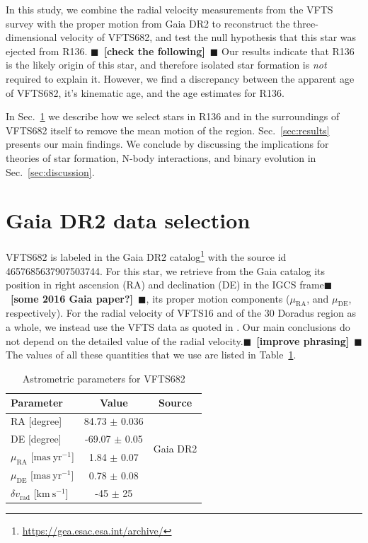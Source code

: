 \documentclass{aa}
\newcommand{\todo}[1]{{\large $\blacksquare$~\textbf{\color{red}[#1]}}~$\blacksquare$}
\newcommand{\kms}{{\mathrm{km\ s^{-1}}}}
\DeclareRobustCommand{\Tabref}[1]{Table~\ref{#1}}
\DeclareRobustCommand{\Secref}[1]{Sec.~\ref{#1}}
\begin{document}
In this study, we combine the radial velocity measurements from the
VFTS survey \citep[][]{evans:11} with the proper motion from Gaia DR2
to reconstruct the three-dimensional velocity of VFTS682, and test the
null hypothesis that this star was ejected from R136. \todo{check the
  following} Our results indicate that R136 is the likely origin of
this star, and therefore isolated star formation is \emph{not}
required to explain it. However, we find a discrepancy between the
apparent age of VFTS682, it's kinematic age, and the age estimates for
R136.

In \Secref{sec:sample} we describe how we select stars in R136 and in
the surroundings of VFTS682 itself to remove the mean motion of the
region. \Secref{sec:results} presents our main findings. We conclude by
discussing the implications for theories of
star formation, N-body interactions, and binary evolution in
\Secref{sec:discussion}.

\section{Gaia DR2 data selection}
\label{sec:sample}
VFTS682 is labeled in the Gaia DR2
catalog\footnote{\url{https://gea.esac.esa.int/archive/}} with the
source id 4657685637907503744. For this star, we retrieve from the
Gaia catalog its position in right ascension (RA) and declination (DE)
in the IGCS frame\cite[][]{brown:18}\todo{some 2016 Gaia paper?}, its
proper motion components ($\mu_\mathrm{RA}$, and $\mu_\mathrm{DE}$,
respectively). For the radial velocity of VFTS16 and of the 30 Doradus
region as a whole, we instead use the VFTS data
as quoted in \cite{bestenlehner:11}. Our main conclusions do not
depend on the detailed value of the radial velocity.\todo{improve
  phrasing} The values of all these quantities that we use are listed
in \Tabref{tab:vfts682}.

\begin{table}[tbp]
  \centering
  \begin{tabular}[htbp]{l|c|c}
    Parameter & Value & Source\\ \hline\hline
    RA \hfill[degree] &  84.73 $\pm$  0.036 & \multirow{4}{*}{Gaia DR2}\\
    DE \hfill [degree] & -69.07 $\pm$  0.05  & \\
    $\mu_\mathrm{RA}$  \hfill[$\mathrm{mas\ yr^{-1}}$] & 1.84 $\pm$ 0.07 & \\
    $\mu_\mathrm{DE}$  \hfill[$\mathrm{mas\ yr^{-1}}$] & 0.78 $\pm$ 0.08& \\
    $\delta v_\mathrm{rad}$  \hfill[$\kms$] & -45 $\pm$ 25 & \cite{bestenlehner:11}\\
    \hline
  \end{tabular}
  \caption{Astrometric parameters for VFTS682}
  \label{tab:vfts682}
\end{table}
\end{document}

